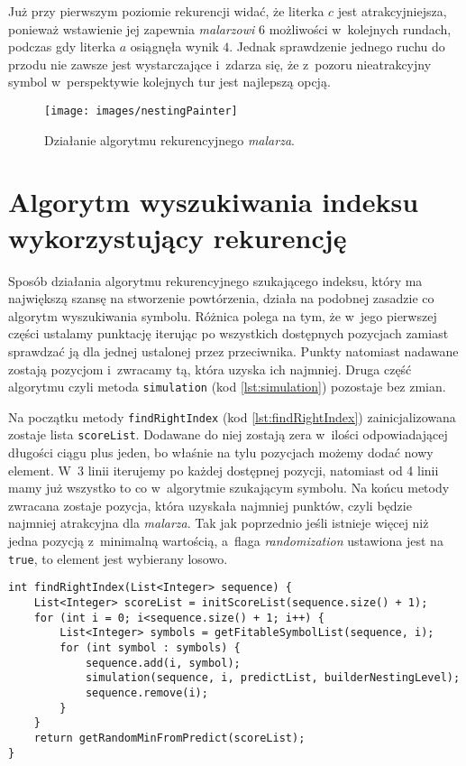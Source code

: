 \documentclass[document]{xmgr}
\begin{document}
Już przy pierwszym poziomie rekurencji widać, że literka $c$ jest atrakcyjniejsza, ponieważ wstawienie jej zapewnia \emph{malarzowi} $6$ możliwości w~kolejnych rundach, podczas gdy literka $a$ osiągnęła wynik $4$. Jednak sprawdzenie jednego ruchu do przodu nie zawsze jest wystarczające i~zdarza się, że z~pozoru nieatrakcyjny symbol w~perspektywie kolejnych tur jest najlepszą opcją.
\begin{figure}[tbh]
    \centering
    \caption{Działanie algorytmu rekurencyjnego \emph{malarza}.}
    \texttt{[image: images/nestingPainter]}
    \label{fig:nestingPainter}
\end{figure}



\section{Algorytm wyszukiwania indeksu wykorzystujący rekurencję}
Sposób działania algorytmu rekurencyjnego szukającego indeksu, który ma największą szansę na stworzenie powtórzenia, działa na podobnej zasadzie co algorytm wyszukiwania symbolu. Różnica polega na tym, że w~jego pierwszej części ustalamy punktację iterując po wszystkich dostępnych pozycjach zamiast sprawdzać ją dla jednej ustalonej przez przeciwnika. Punkty natomiast nadawane zostają pozycjom i~zwracamy tą, która uzyska ich najmniej. Druga część algorytmu czyli metoda \texttt{simulation} (kod \ref{lst:simulation}) pozostaje bez zmian.

Na początku metody \texttt{findRightIndex} (kod \ref{lst:findRightIndex}) zainicjalizowana zostaje lista \texttt{scoreList}. Dodawane do niej zostają zera w~ilości odpowiadającej długości ciągu plus jeden, bo właśnie na tylu pozycjach możemy dodać nowy element. W~3 linii iterujemy po każdej dostępnej pozycji, natomiast od 4 linii mamy już wszystko to co w~algorytmie szukającym symbolu. Na końcu metody zwracana zostaje pozycja, która uzyskała najmniej punktów, czyli będzie najmniej atrakcyjna dla \emph{malarza}. Tak jak poprzednio jeśli istnieje więcej niż jedna pozycją z~minimalną wartością, a~flaga \emph{randomization} ustawiona jest na \texttt{true}, to element jest wybierany losowo.

\begin{lstlisting}[caption={Metoda szukająca pozycji, wykorzystująca rekurencję.},label=lst:findRightIndex]
int findRightIndex(List<Integer> sequence) {
	List<Integer> scoreList = initScoreList(sequence.size() + 1);
	for (int i = 0; i<sequence.size() + 1; i++) {
		List<Integer> symbols = getFitableSymbolList(sequence, i);
		for (int symbol : symbols) {
			sequence.add(i, symbol);
			simulation(sequence, i, predictList, builderNestingLevel);
			sequence.remove(i);
		}
	}
	return getRandomMinFromPredict(scoreList);
}
\end{lstlisting}
\end{document}
